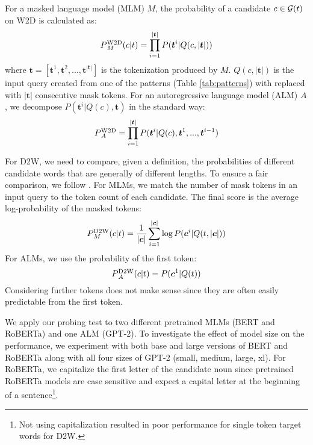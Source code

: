 \documentclass[11pt,a4paper]{article}
\def\uprm#1#2{\mbox{$_#2^{\hbox{\scriptsize #1}}$}}
\begin{document}

For a masked language model (MLM)
$M$, the probability of a candidate $c \in {\cal G}(t)$ on W2D  is calculated as:
\begin{equation*}
  P\uprm{W2D}{M} (c|t) = \prod_{i=1}^{|\bm{t}|}P(\bm{t}^i|Q(c,|\bm{t}|))
\end{equation*}
where $\bm{t} = [\bm{t}^1, \bm{t}^2,...,\bm{t}^{|\bm{t}|}]$
is the tokenization produced by  $M$. $Q(c,|\bm{t}|)$ is the
input query
created from one of the patterns (Table \ref{tab:patterns})
with \underline{\hspace{3mm}} replaced with
$|\bm{t}|$ consecutive mask tokens. For an autoregressive
language model (ALM) $A$, we
decompose $P(\bm{t}^i|Q(c),\bm{t})$ in the standard way:
\begin{equation*}
    P\uprm{W2D}{A} = \prod_{i=1}^{|\bm{t}|}P(\bm{t}^i|Q(c),\bm{t}^{1},...,\bm{t}^{i-1})
\end{equation*}

For D2W, we need to compare, given a definition, the probabilities of
different candidate words that are generally of different lengths.
To ensure a fair comparison,
we follow
. For MLMs, we
match the number of mask tokens in an input query to the
token count of each candidate. The final score is the average log-probability of the masked tokens:
\begin{equation*}
    P\uprm{D2W}{M}(c|t) =
    \frac{1}{|\bm{c}|}\sum_{i=1}^{|\bm{c}|}\log P(\bm{c}^i |
    Q(t,|\bm{c}|))
\end{equation*}
For ALMs, we use the probability of
the first token:
\begin{equation*}
    P\uprm{D2W}{A}(c|t) =
     P(\bm{c}^1 |
    Q(t))
\end{equation*}
Considering further tokens does not make sense since they
are often easily predictable from the first token.


We apply our probing test to two different pretrained
MLMs (BERT and
RoBERTa) and one ALM
(GPT-2). 
To investigate the effect of model
size on the performance, we experiment with both
base and large versions of BERT and RoBERTa
along with all four sizes of GPT-2 (small, medium,
large, xl). 
For RoBERTa, we capitalize the first letter of the candidate
noun since pretrained RoBERTa models are case sensitive
and expect a capital letter at the beginning of a
sentence\footnote{Not using capitalization resulted in poor performance for single token target words for D2W.}.
\end{document}
